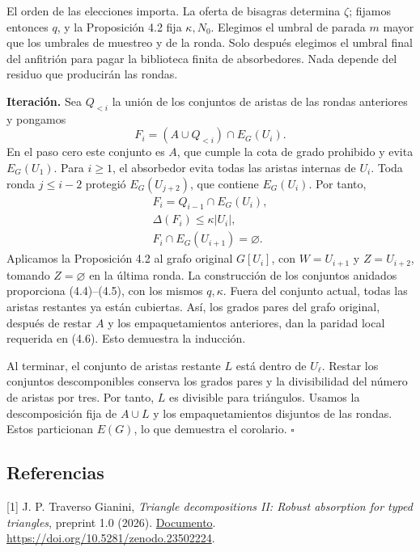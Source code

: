 \documentclass[spanish,11pt,a4paper]{article}
\begin{document}
El orden de las elecciones importa. La oferta de bisagras determina \(\zeta\); fijamos entonces \(q\), y la Proposición 4.2 fija \(\kappa,N_0\). Elegimos el umbral de parada \(m\) mayor que los umbrales de muestreo y de la ronda. Solo después elegimos el umbral final del anfitrión para pagar la biblioteca finita de absorbedores. Nada depende del residuo que producirán las rondas.

\textbf{Iteración.} Sea \(Q_{<i}\) la unión de los conjuntos de aristas de las rondas anteriores y pongamos \[F_i=(A\cup Q_{<i})\cap E_G(U_i).
\tag{A.6}\] En el paso cero este conjunto es \(A\), que cumple la cota de grado prohibido y evita \(E_G(U_1)\). Para \(i\ge1\), el absorbedor evita todas las aristas internas de \(U_i\). Toda ronda \(j\le i-2\) protegió \(E_G(U_{j+2})\), que contiene \(E_G(U_i)\). Por tanto, \[\begin{gathered}
F_i=Q_{i-1}\cap E_G(U_i),\\
\Delta(F_i)\le\kappa|U_i|,\\
F_i\cap E_G(U_{i+1})=\varnothing.
\end{gathered}\] Aplicamos la Proposición 4.2 al grafo original \(G[U_i]\), con \(W=U_{i+1}\) y \(Z=U_{i+2}\), tomando \(Z=\varnothing\) en la última ronda. La construcción de los conjuntos anidados proporciona (4.4)--(4.5), con los mismos \(q,\kappa\). Fuera del conjunto actual, todas las aristas restantes ya están cubiertas. Así, los grados pares del grafo original, después de restar \(A\) y los empaquetamientos anteriores, dan la paridad local requerida en (4.6). Esto demuestra la inducción.

Al terminar, el conjunto de aristas restante \(L\) está dentro de \(U_\ell\). Restar los conjuntos descomponibles conserva los grados pares y la divisibilidad del número de aristas por tres. Por tanto, \(L\) es divisible para triángulos. Usamos la descomposición fija de \(A\cup L\) y los empaquetamientos disjuntos de las rondas. Estos particionan \(E(G)\), lo que demuestra el corolario. \(\square\)

\subsection{Referencias}\label{referencias}

\begingroup\small\raggedright
\setlength{\parskip}{3pt}

{[}1{]} J. P. Traverso Gianini, \emph{Triangle decompositions II: Robust absorption for typed triangles}, preprint 1.0 (2026). \href{https://github.com/jtraverso/nash-williams-triangle-decompositions-release/blob/main/preprints/PAPER_II/01_manuscript/PAPER_II_preprint_v1.0_es.md}{Documento}. \url{https://doi.org/10.5281/zenodo.23502224}.
\end{document}
